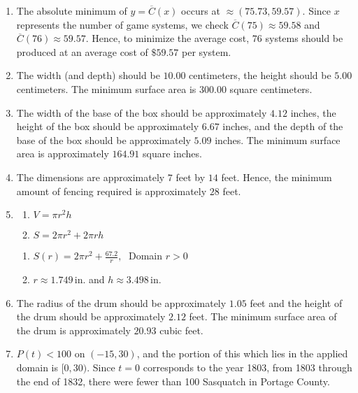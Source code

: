 \begin{enumerate}
\setcounter{enumi}{\value{HW}}

\item  The absolute minimum of $y=\overline{C}(x)$ occurs at $\approx (75.73, 59.57)$.  Since $x$ represents the number of game systems, we check $\overline{C}(75) \approx 59.58$ and $\overline{C}(76) \approx 59.57$.  Hence, to minimize the average cost, $76$ systems should be produced at an average cost of $\$59.57$ per system.

\item The width (and depth) should be $10.00$ centimeters, the height should be $5.00$ centimeters.  The minimum surface area is $300.00$ square centimeters.

\item The width of the base of the box should be approximately $4.12$ inches, the height of the box should be approximately $ 6.67$ inches, and the depth of the base of the box should be approximately $5.09$ inches. The minimum surface area is approximately $164.91$ square inches.

\newpage

\item The dimensions are  approximately  $7$ feet by $14$ feet.  Hence, the minimum amount of fencing required is approximately  $28$ feet.

\item 

\begin{multicols}{2}
\begin{enumerate}

\item $V = \pi r^{2}h$
\item $S = 2 \pi r^{2} + 2\pi r h$

\setcounter{HWindent}{\value{enumii}}
\end{enumerate}
\end{multicols}



\begin{multicols}{2}
\begin{enumerate}
\setcounter{enumii}{\value{HWindent}}

\item $S(r) = 2\pi r^{2} + \frac{67.2}{r}, \;$  Domain $r > 0$
\item $r \approx 1.749\,$in. and $h \approx 3.498\,$in. 

\end{enumerate}
\end{multicols}

\item  The radius of the drum should be approximately $1.05$ feet and the height of the drum should be approximately  $2.12$ feet.  The minimum surface area of the drum is approximately $20.93$ cubic feet.

\item $P(t) < 100$ on $(-15, 30)$, and the portion of this which lies in the applied domain is $[0,30)$.  Since $t=0$ corresponds to the year 1803, from 1803 through the end of 1832, there were fewer than 100 Sasquatch in Portage County.

\setcounter{HW}{\value{enumi}}
\end{enumerate}

